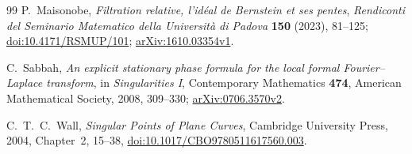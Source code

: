 \documentclass[11pt]{article}
\theoremstyle{definition}\newtheorem{definition}[theorem]{Definition}
\theoremstyle{remark}\newtheorem{remark}[theorem]{Remark}
\begin{document}
\begin{thebibliography}{99}
P.~Maisonobe, \emph{Filtration relative, l'id\'eal de Bernstein et ses
pentes}, \emph{Rendiconti del Seminario Matematico della Universit\`a
di Padova} \textbf{150} (2023), 81--125;
\href{https://doi.org/10.4171/RSMUP/101}{doi:10.4171/RSMUP/101};
\href{https://arxiv.org/abs/1610.03354v1}{arXiv:1610.03354v1}.

C.~Sabbah, \emph{An explicit stationary phase formula for the local
formal Fourier--Laplace transform}, in \emph{Singularities I},
Contemporary Mathematics \textbf{474}, American Mathematical Society,
2008, 309--330;
\href{https://arxiv.org/abs/0706.3570v2}{arXiv:0706.3570v2}.

C.~T.~C.~Wall, \emph{Singular Points of Plane Curves}, Cambridge
University Press, 2004, Chapter~2, 15--38,
\href{https://doi.org/10.1017/CBO9780511617560.003}{doi:10.1017/CBO9780511617560.003}.

\end{thebibliography}
\end{document}
